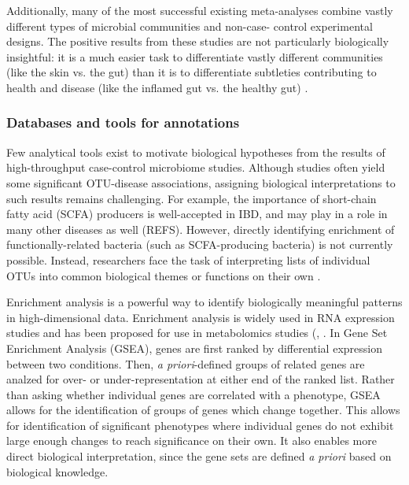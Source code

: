 \documentclass[12pt]{article}
\begin{document}
Additionally, many of the most successful existing meta-analyses 
combine vastly different types of microbial communities and non-case-
control experimental designs. The positive results from these studies 
are not particularly biologically insightful: it is a much easier task 
to differentiate vastly different communities (like the skin vs. the 
gut) than it is to differentiate subtleties contributing to health and 
disease (like the inflamed gut vs. the healthy gut) \cite{knights-supervised-2010}.

\subsubsection{Databases and tools for annotations}\label{sec:gsea}
Few analytical tools exist to motivate biological hypotheses from the 
results of high-throughput case-control microbiome studies. Although 
studies often yield some significant OTU-disease associations, 
assigning biological interpretations to such results remains 
challenging. For example, the importance of short-chain fatty acid 
(SCFA) producers is well-accepted in IBD, and may play in a role in 
many other diseases as well (REFS). However, directly identifying 
enrichment of functionally-related bacteria (such as SCFA-producing 
bacteria) is not currently possible. Instead, researchers face the 
task of interpreting lists of individual OTUs into common biological 
themes or functions on their own \cite{subramanian-gsea-2005}. 

Enrichment analysis is a powerful way to identify biologically 
meaningful patterns in high-dimensional data. Enrichment analysis is 
widely used in RNA expression studies and has been proposed for use in 
metabolomics studies (\cite{subramanian-gsea-2005}, 
\cite{xia-msea-2010}. In Gene Set Enrichment Analysis (GSEA), genes are first 
ranked by differential expression between two conditions. Then, 
\textit{a priori}-defined groups of related genes are analzed for 
over- or under-representation at either end of the ranked list. Rather 
than asking whether individual genes are correlated with a phenotype, 
GSEA allows for the identification of groups of genes which change 
together. This allows for identification of significant phenotypes 
where individual genes do not exhibit large enough changes to reach 
significance on their own. It also enables more direct biological 
interpretation, since the gene sets are defined \textit{a priori} 
based on biological knowledge. 
\end{document}
